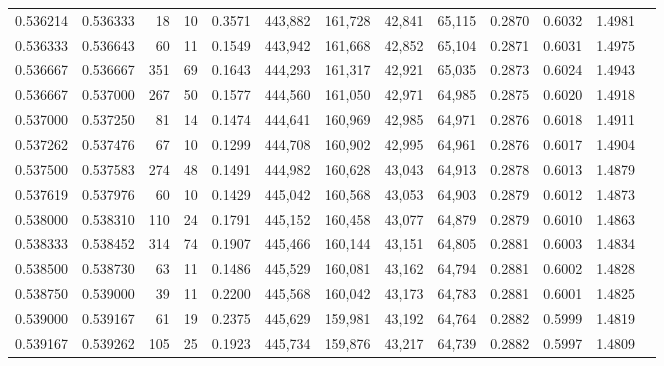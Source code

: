 \begin{tabular}{rrrrrrrrrrrrr}
0.536214 & 0.536333 &    18 &  10 &                                     0.3571 & 443,882 & 161,728 &  42,841 &  65,115 & 0.2870 & 0.6032 & 1.4981 \\
0.536333 & 0.536643 &    60 &  11 &                                     0.1549 & 443,942 & 161,668 &  42,852 &  65,104 & 0.2871 & 0.6031 & 1.4975 \\
0.536667 & 0.536667 &   351 &  69 &                                     0.1643 & 444,293 & 161,317 &  42,921 &  65,035 & 0.2873 & 0.6024 & 1.4943 \\
0.536667 & 0.537000 &   267 &  50 &                                     0.1577 & 444,560 & 161,050 &  42,971 &  64,985 & 0.2875 & 0.6020 & 1.4918 \\
0.537000 & 0.537250 &    81 &  14 &                                     0.1474 & 444,641 & 160,969 &  42,985 &  64,971 & 0.2876 & 0.6018 & 1.4911 \\
0.537262 & 0.537476 &    67 &  10 &                                     0.1299 & 444,708 & 160,902 &  42,995 &  64,961 & 0.2876 & 0.6017 & 1.4904 \\
0.537500 & 0.537583 &   274 &  48 &                                     0.1491 & 444,982 & 160,628 &  43,043 &  64,913 & 0.2878 & 0.6013 & 1.4879 \\
0.537619 & 0.537976 &    60 &  10 &                                     0.1429 & 445,042 & 160,568 &  43,053 &  64,903 & 0.2879 & 0.6012 & 1.4873 \\
0.538000 & 0.538310 &   110 &  24 &                                     0.1791 & 445,152 & 160,458 &  43,077 &  64,879 & 0.2879 & 0.6010 & 1.4863 \\
0.538333 & 0.538452 &   314 &  74 &                                     0.1907 & 445,466 & 160,144 &  43,151 &  64,805 & 0.2881 & 0.6003 & 1.4834 \\
0.538500 & 0.538730 &    63 &  11 &                                     0.1486 & 445,529 & 160,081 &  43,162 &  64,794 & 0.2881 & 0.6002 & 1.4828 \\
0.538750 & 0.539000 &    39 &  11 &                                     0.2200 & 445,568 & 160,042 &  43,173 &  64,783 & 0.2881 & 0.6001 & 1.4825 \\
0.539000 & 0.539167 &    61 &  19 &                                     0.2375 & 445,629 & 159,981 &  43,192 &  64,764 & 0.2882 & 0.5999 & 1.4819 \\
0.539167 & 0.539262 &   105 &  25 &                                     0.1923 & 445,734 & 159,876 &  43,217 &  64,739 & 0.2882 & 0.5997 & 1.4809 \\

\end{tabular}
